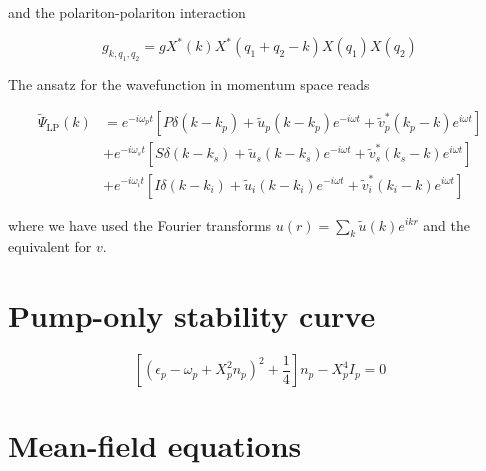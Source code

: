 \documentclass[a4paper,prb,10pt,aps,twocolumn]{revtex4-1}
\begin{document}
and the polariton-polariton interaction

\begin{equation}
g_{k,q_1,q_2} = g X^*(k) X^*(q_1+q_2-k) X(q_1) X(q_2)
\end{equation}

The ansatz for the wavefunction in momentum space reads

\begin{align}
\widetilde{\Psi}_{\text{LP}}(k) &= e^{-i\omega_p t} \left[P\delta(k-k_p) + 
\widetilde{u}_p(k-k_p) e^{-i \omega t} + \widetilde{v}^*_p(k_p-k) e^{i \omega 
t}\right] \nonumber \\
& + e^{-i\omega_s t} \left[S\delta(k-k_s) + \widetilde{u}_s(k-k_s) e^{-i \omega 
t} + \widetilde{v}^*_s(k_s-k) e^{i \omega t}\right] \nonumber \\
& + e^{-i\omega_i t} \left[I\delta(k-k_i) + \widetilde{u}_i(k-k_i) e^{-i \omega 
t} + \widetilde{v}^*_i(k_i-k) e^{i \omega t}\right]
\end{align}

where we have used the Fourier transforms
$u(r)=\sum_k \widetilde{u}(k) e^{ikr}$ and the equivalent for $v$.


    
\section{Pump-only stability curve}

\[\left[\left(\epsilon_{p}-\omega_{p}+X_{p}^{2}n_{p}\right)^{2}+\frac{1}{4}\right]n_{p}-X_{p}^{4}I_{p}=0\]


\section{Mean-field equations}
\end{document}
